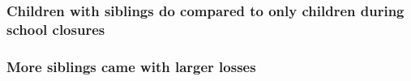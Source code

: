 \documentclass{beamer}
\begin{document}



    

\begin{frame}
    \label{frame:eventstudy}
    \frametitle{Children with siblings do compared to only children during school closures}
        {
    }
\end{frame}

\begin{frame}
    \label{frame:eventstudy_bysibs}
    \frametitle{More siblings came with larger losses}
        {
    }
\end{frame}
\end{document}
